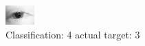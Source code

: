 \begin{figure}[h!]
\begin{center}
\includegraphics[width=0.60\columnwidth]{figures/ID74_class_4_target_3.png}
\end{center}
\caption{ Classification: 4 actual target: 3}
\label{fig:ID74_class_4_target_3}
\end{figure}
